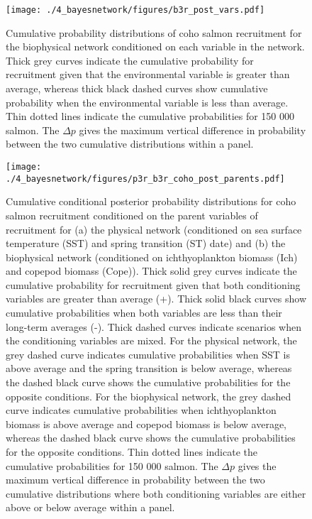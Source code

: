 \begin{figure}[htbp]
  \centering \texttt{[image: ./4\_bayesnetwork/figures/b3r\_post\_vars.pdf]}
  \caption[Cumulative probability distributions of coho salmon recruitment for
    the biophysical network conditioned on each variable in the
    network.]{Cumulative probability distributions of coho salmon recruitment
    for the biophysical network conditioned on each variable in the network.
    Thick grey curves indicate the cumulative probability for recruitment given
    that the environmental variable is greater than average, whereas thick black
    dashed curves show cumulative probability when the environmental variable is
    less than average. Thin dotted lines indicate the cumulative probabilities
    for 150 000 salmon. The \(\Delta p\) gives the maximum vertical difference
    in probability between the two cumulative distributions within a panel.}
  \label{fig:bn:7}
\end{figure}

\begin{figure}[htbp]
  \centering \texttt{[image: ./4\_bayesnetwork/figures/p3r\_b3r\_coho\_post\_parents.pdf]}
  \caption[Cumulative conditional posterior probability distributions for coho
    salmon recruitment conditioned on the parent variables of
    recruitment.]{Cumulative conditional posterior probability distributions for
    coho salmon recruitment conditioned on the parent variables of recruitment
    for (a) the physical network (conditioned on sea surface temperature (SST)
    and spring transition (ST) date) and (b) the biophysical network
    (conditioned on ichthyoplankton biomass (Ich) and copepod biomass (Cope)).
    Thick solid grey curves indicate the cumulative probability for recruitment
    given that both conditioning variables are greater than average (+). Thick
    solid black curves show cumulative probabilities when both variables are
    less than their long-term averages (-). Thick dashed curves indicate
    scenarios when the conditioning variables are mixed. For the physical
    network, the grey dashed curve indicates cumulative probabilities when SST
    is above average and the spring transition is below average, whereas the
    dashed black curve shows the cumulative probabilities for the opposite
    conditions. For the biophysical network, the grey dashed curve indicates
    cumulative probabilities when ichthyoplankton biomass is above average and
    copepod biomass is below average, whereas the dashed black curve shows the
    cumulative probabilities for the opposite conditions. Thin dotted lines
    indicate the cumulative probabilities for 150 000 salmon.  The \(\Delta p\)
    gives the maximum vertical difference in probability between the two
    cumulative distributions where both conditioning variables are either above
    or below average within a panel.}
  \label{fig:bn:8}
\end{figure}

